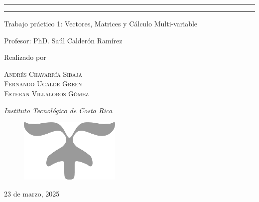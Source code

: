 \documentclass{article}
\begin{document}
\begin{titlepage}
	\rule{\textwidth}{0.4pt}\vspace*{-\baselineskip}\vspace{3.2pt} %
	\rule{\textwidth}{1.6pt} %
	
	\vspace{2\baselineskip} %
	
	
	Trabajo práctico 1: Vectores, Matrices y Cálculo Multi-variable
	
	
	\vspace*{2\baselineskip}
	
	Profesor:
	PhD. Saúl Calderón Ramírez
	
	\vspace*{3\baselineskip} %
	
	
	Realizado por
	
	\vspace{0.5\baselineskip} %
	
    {\scshape\Large Andrés Chavarría Sibaja \\ Fernando Ugalde Green \\
    Esteban Villalobos Gómez\\} %
	
	\vspace{2\baselineskip} %
	
	\textit{Instituto Tecnológico de Costa Rica} %
	
	\vfill %
	
	
	\begin{figure}[h]
    \centering
    \includegraphics{PortadaInferior.png} 
    \end{figure}
	
	\vspace{0.3\baselineskip} %
	
	23 de marzo, 2025  %
	

\end{titlepage}
\end{document}
